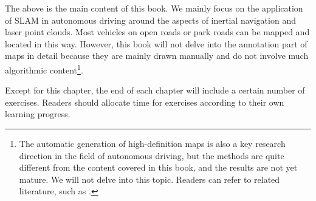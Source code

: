 The above is the main content of this book. We mainly focus on the application of SLAM in autonomous driving around the aspects of inertial navigation and laser point clouds. Most vehicles on open roads or park roads can be mapped and located in this way. However, this book will not delve into the annotation part of maps in detail because they are mainly drawn manually and do not involve much algorithmic content\footnote{The automatic generation of high-definition maps is also a key research direction in the field of autonomous driving, but the methods are quite different from the content covered in this book, and the results are not yet mature. We will not delve into this topic. Readers can refer to related literature, such as \cite{Elhousni2020, Liao2022}.}.

Except for this chapter, the end of each chapter will include a certain number of exercises. Readers should allocate time for exercises according to their own learning progress.
